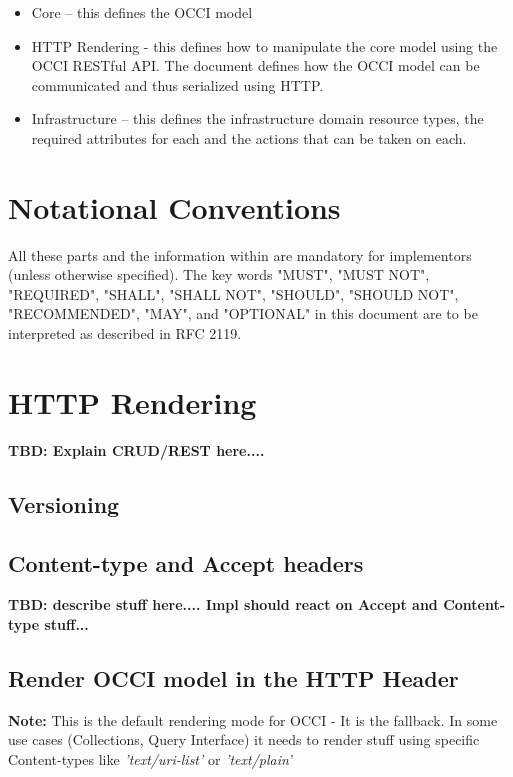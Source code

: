 \documentclass[10pt,a4paper]{article}
\begin{document}
\begin{itemize}
\item Core – this defines the OCCI model
\item HTTP Rendering - this defines how to manipulate the core model using the OCCI RESTful API. The document defines how the OCCI model can be communicated and thus serialized using HTTP.
\item Infrastructure – this defines the infrastructure domain resource types, the required attributes for each and the actions that can be taken on each.
\end{itemize}

\section{Notational Conventions}

All these parts and the information within are mandatory for implementors (unless otherwise specified). The key words "MUST", "MUST NOT", "REQUIRED", "SHALL", "SHALL NOT", "SHOULD", "SHOULD NOT", "RECOMMENDED", "MAY", and "OPTIONAL" in this document are to be interpreted as described in RFC 2119. 

\section{HTTP Rendering}

\textbf{TBD: Explain CRUD/REST here....}

\subsection{Versioning}

\subsection{Content-type and Accept headers}

\textbf{TBD: describe stuff here.... Impl should react on Accept and Content-type stuff...}

\subsection{Render OCCI model in the HTTP Header}

\textbf{Note:} This is the default rendering mode for OCCI - It is the fallback. In some use cases (Collections, Query Interface) it needs to render stuff using specific Content-types like \textit{'text/uri-list'} or \textit{'text/plain'}
\end{document}
